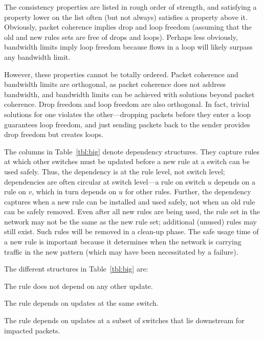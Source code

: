 The consistency properties are listed in rough order of strength, and satisfying a property lower on the list often (but not always) satisfies a property above it. Obviously, packet coherence implies drop and loop freedom (assuming that the old and new rules sets are free of drops and loops). Perhaps less obviously, bandwidth limits imply loop freedom because flows in a loop will likely surpass any bandwidth limit.

However, these properties cannot be totally ordered. Packet coherence and bandwidth limits are orthogonal, as packet coherence does not address bandwidth, and bandwidth limits can be achieved with solutions beyond packet coherence.
Drop freedom and loop freedom are also orthogonal. In fact, trivial solutions for one violates the other---dropping packets before they enter a loop guarantees loop freedom, and just sending packets back to the sender provides drop freedom but creates loops.


The columns in Table~\ref{tbl:big} denote dependency structures. They capture rules at which other switches must be updated before a new rule at a switch can be used safely. Thus, the dependency is at the rule level, not switch level; dependencies are often circular at switch level---a rule on switch $u$ depends on a rule on $v$, which in turn depends on $u$ for other rules.
Further, the dependency captures when a new rule can be installed and used safely, not when an old rule can be safely removed. Even after all new rules are being used, the rule set in the network may not be the same as the new rule set; additional (unused) rules may still exist. Such rules will be removed in a clean-up phase. The safe usage time of a new rule is important because it determines when the network is carrying traffic in the new pattern (which may have been necessitated by a failure).



The different structures in Table~\ref{tbl:big} are:

 The rule does not depend on any other update.

 The rule depends on updates at the same switch.

 The rule depends on updates at a subset of switches that lie downstream for impacted packets.


